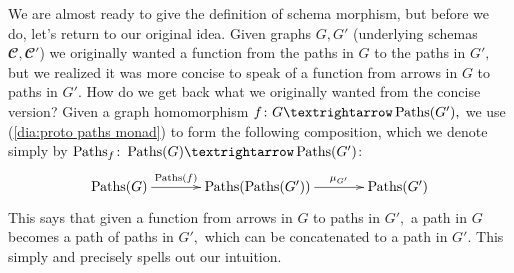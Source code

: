 \documentclass[../main/CT4S-EN-RU]{subfiles}
\begin{document}
\begin{exerciseRUS}
\end{exerciseRUS}

\begin{blockENG}
We are almost ready to give the definition of schema morphism, but before we do, let's return to our original idea. Given graphs $G,G'$ (underlying schemas ${𝓒},{𝓒}'$) we originally wanted a function from the paths in $G$ to the paths in $G',$ but we realized it was more concise to speak of a function from arrows in $G$ to paths in $G'.$ How do we get back what we originally wanted from the concise version? Given a graph homomorphism $f\colon G{→}\Paths(G'),$ we use (\ref{dia:proto paths monad}) to form the following composition, which we denote simply by $\Paths_f\colon\Paths(G){→}\Paths(G')$:
\begin{align}\label{dia:kleisli comp in graph}
\xymatrix@=35pt{\Paths(G)\ar[r]^-{\Paths(f)}&\Paths(\Paths(G'))\ar[r]^-{\mu_{G'}}&\Paths(G')}
\end{align}
This says that given a function from arrows in $G$ to paths in $G',$ a path in $G$ becomes a path of paths in $G',$ which can be concatenated to a path in $G'.$ This simply and precisely spells out our intuition.
\end{blockENG}

\begin{blockRUS}
\end{blockRUS}
\end{document}
